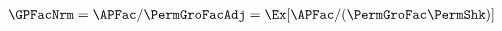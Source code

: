  \begin{equation}\begin{gathered}\begin{aligned}
    \GPFacNrm  & = \APFac/\PermGroFacAdj = \Ex[\APFac/(\PermGroFac\PermShk)]  \label{eq:GPFacModDefn}
  \end{aligned}\end{gathered}\end{equation}
